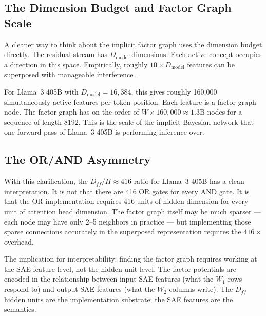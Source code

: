 \subsection*{The Dimension Budget and Factor Graph Scale}

A cleaner way to think about the implicit factor graph uses the dimension budget directly.
The residual stream has $D_{\mathrm{model}}$ dimensions. Each active concept occupies a
direction in this space. Empirically, roughly $10 \times D_{\mathrm{model}}$ features can be
superposed with manageable interference~\cite{elhage2022superposition}.

For Llama~3 405B with $D_{\mathrm{model}} = 16{,}384$, this gives roughly 160,000
simultaneously active features per token position. Each feature is a factor graph node. The
factor graph has on the order of $W \times 160{,}000 \approx 1.3\mathrm{B}$ nodes for a
sequence of length 8192. This is the scale of the implicit Bayesian network that one forward
pass of Llama~3 405B is performing inference over.

\subsection*{The OR/AND Asymmetry}

With this clarification, the $D_{ff}/H \approx 416$ ratio for Llama~3 405B has a clean
interpretation. It is not that there are 416 OR gates for every AND gate. It is that the OR
implementation requires 416 units of hidden dimension for every unit of attention head
dimension. The factor graph itself may be much sparser --- each node may have only 2--5
neighbors in practice --- but implementing those sparse connections accurately in the
superposed representation requires the $416\times$ overhead.

The implication for interpretability: finding the factor graph requires working at the SAE
feature level, not the hidden unit level. The factor potentials are encoded in the relationship
between input SAE features (what the $W_1$ rows respond to) and output SAE features (what the
$W_2$ columns write). The $D_{ff}$ hidden units are the implementation substrate; the SAE
features are the semantics.